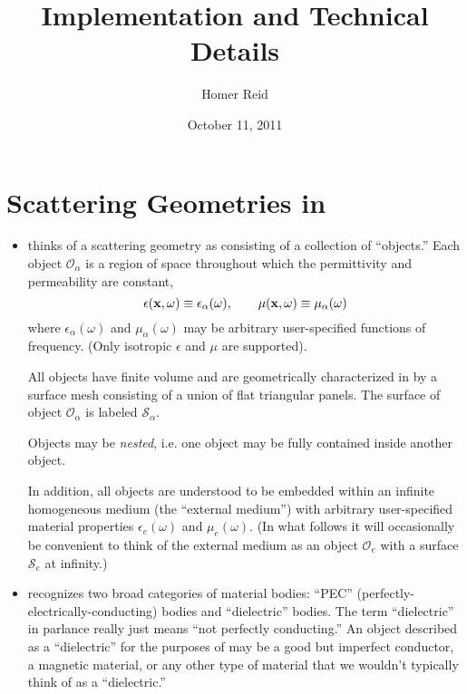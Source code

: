 \documentclass[dvips,letterpaper]{article}
\title {\lss Implementation and Technical Details}
\author {Homer Reid}
\date {October 11, 2011}
\begin{document}
\pagestyle{myheadings}
\maketitle

\tableofcontents

\newpage
\section{Scattering Geometries in \lss}

\begin{itemize}

\item
\lss thinks of a scattering geometry as consisting of a collection
of ``objects.'' Each object $\mathcal{O}_\alpha$ is a region of
space throughout which the permittivity and permeability are constant,
$$ \epsilon(\mathbf{x}, \omega) \equiv \epsilon_\alpha(\omega), \qquad
   \mu(\mathbf{x}, \omega)      \equiv \mu_\alpha(\omega)
$$
where $\epsilon_\alpha(\omega)$ and $\mu_\alpha(\omega)$ may
be arbitrary user-specified functions of frequency. 
(Only isotropic $\epsilon$ and $\mu$ are supported).

All objects have finite volume and are geometrically characterized 
in \lss by a surface mesh consisting of a union of flat triangular
panels. The surface of object $\mathcal{O}_\alpha$ is labeled 
$\mathcal{S}_\alpha$.

Objects may be \textit{nested}, i.e. one object may be 
fully contained inside another object. 

In addition, all objects are understood to be embedded within an 
infinite homogeneous medium (the ``external medium'') with 
arbitrary user-specified material properties 
$\epsilon_e(\omega)$ and $\mu_e(\omega)$. (In what follows it
will occasionally be convenient to think of the external
medium as an object $\mathcal{O}_e$ with a surface $\mathcal{S}_e$
at infinity.)

\item
\lss recognizes two broad categories of material bodies:
``PEC'' (perfectly-electrically-conducting) bodies and
``dielectric'' bodies. 
The term ``dielectric'' in \lss parlance really just means
``not perfectly conducting.'' An object described as a ``dielectric''
for the purposes of \lss may be a good but imperfect conductor,
a magnetic material, or any other type of material that we wouldn't
typically think of as a ``dielectric.''


\end{itemize}
\end{document}
